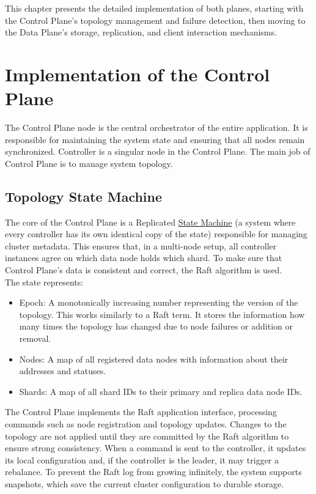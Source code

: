 \documentclass[shortabstract]{iithesis}
\begin{document}
This chapter presents the detailed implementation of both planes, starting with the Control Plane's topology management and failure detection, then moving to the Data Plane's storage, replication, and client interaction mechanisms.

\section{Implementation of the Control Plane}

The Control Plane node is the central orchestrator of the entire application. It is responsible for maintaining the system state and ensuring that all nodes remain synchronized. Controller is a singular node in the Control Plane. The main job of Control Plane is to manage system topology. 

\subsection{Topology State Machine}

The core of the Control Plane is a Replicated \hyperref[def:statemachine]{State Machine} (a system where every controller has its own identical copy of the state) responsible for managing cluster metadata. This ensures that, in a multi-node setup, all controller instances agree on which data node holds which shard. To make sure that Control Plane's data is consistent and correct, the Raft algorithm is used. \\
The state represents:
\begin{itemize}
    \item Epoch: A monotonically increasing number representing the version of the topology. This works similarly to a Raft term. It stores the information how many times the topology has changed due to node failures or addition or removal.
    \item Nodes: A map of all registered data nodes with information about their addresses and statuses.
    \item Shards: A map of all shard IDs to their primary and replica data node IDs.
\end{itemize}

The Control Plane implements the Raft application interface, processing commands such as node registration and topology updates. Changes to the topology are not applied until they are committed by the Raft algorithm to ensure strong consistency. When a command is sent to the controller, it updates its local configuration and, if the controller is the leader, it may trigger a rebalance. To prevent the Raft log from growing infinitely, the system supports snapshots, which save the current cluster configuration to durable storage. 
\end{document}
